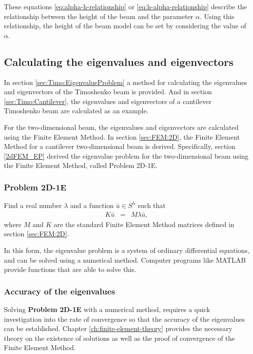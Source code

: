 \documentclass[../../main.tex]{subfiles}
\begin{document}
These equations \eqref{eq:alpha-h-relationship} or \eqref{eq:h-alpha-relationship} describe the relationship between the height of the beam and the parameter $\alpha$. Using this relationship, the height of the beam model can be set by considering the value of $\alpha$.


\subsection{Calculating the eigenvalues and eigenvectors}
In section \ref{sec:Timo:EigenvalueProblem} a method for calculating the eigenvalues and eigenvectors of the Timoshenko beam is provided. And in section \ref{sec:Timo:Cantilever}, the eigenvalues and eigenvectors of a cantilever Timoshenko beam are calculated as an example. 

For the two-dimensional beam, the eigenvalues and eigenvectors are calculated using the Finite Element Method. In section \ref{sec:FEM:2D}, the Finite Element Method for a cantilever two-dimensional beam is derived. Specifically, section \ref{2dFEM_EP} derived the eigenvalue problem for the two-dimensional beam using the Finite Element Method, called Problem 2D-1E.

\subsubsection{Problem 2D-1E}
Find a real number $\lambda$ and a function $\bar{u} \in S^h$ such that
\begin{eqnarray}
	K\bar{u} & = & M\lambda{\bar{u}},
\end{eqnarray} where $M$ and $K$ are the standard Finite Element Method matrices defined in section \ref{sec:FEM:2D}.

In this form, the eigenvalue problem is a system of ordinary differential equations, and can be solved using a numerical method. Computer programs like MATLAB provide functions that are able to solve this.

\subsubsection{Accuracy of the eigenvalues}
Solving \textbf{Problem 2D-1E} with a numerical method, requires a quick investigation into the rate of convergence so that the accuracy of the eigenvalues can be established. Chapter \ref{ch:finite-element-theory} provides the necessary theory on the existence of solutions as well as the proof of convergence of the Finite Element Method.
\end{document}
